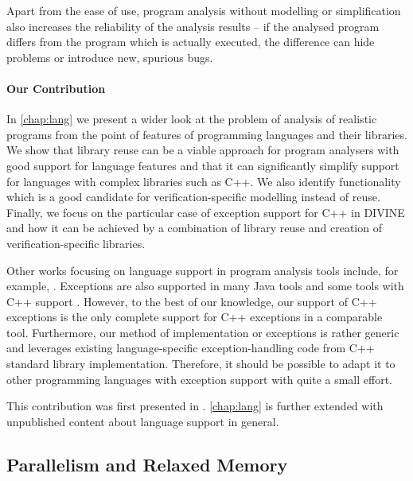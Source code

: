 Apart from the ease of use, program analysis without modelling or simplification also increases the reliability of the analysis results --
if the analysed program differs from the program which is actually executed, the difference can hide problems or introduce new, spurious bugs.

\paragraph{Our Contribution}
In \autoref{chap:lang} we present a wider look at the problem of analysis of realistic
programs from the point of features of programming languages and their libraries.
We show that library reuse can be a viable approach for program analysers with
good support for language features and that it can significantly simplify
support for languages with complex libraries such as C++.
We also identify functionality which is a good candidate for
verification-specific modelling instead of reuse.
Finally, we focus on the particular case of exception support
for C++ in DIVINE and how it can be achieved by a combination of library reuse
and creation of verification-specific libraries.

Other works focusing on language support in program analysis tools include, for example, .
Exceptions are also supported in many Java tools and some tools with C++ support .
However, to the best of our knowledge, our support of C++ exceptions is the only complete support for C++ exceptions in a comparable tool.
Furthermore, our method of implementation or exceptions is rather generic and leverages existing language-specific exception-handling code from C++ standard library implementation.
Therefore, it should be possible to adapt it to other programming languages with exception support with quite a small effort.

This contribution was first presented in . \autoref{chap:lang} is further extended with unpublished content about language support in general.



\subsection{Parallelism and Relaxed Memory}

